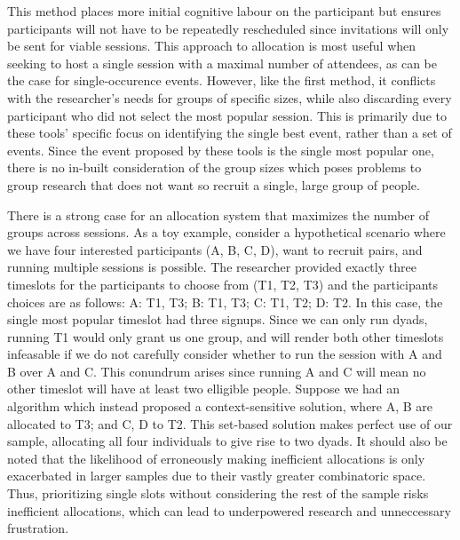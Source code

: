 \documentclass{article}
\begin{document}
  This method places more initial cognitive labour on the participant but ensures 
  participants will not have to be repeatedly rescheduled since invitations will only be sent for viable sessions.
  This approach to allocation is most useful when seeking to host a single session
  with a maximal number of attendees, as can be the case for single-occurence events. However, like the first method, it conflicts with the 
  researcher's needs for groups of specific sizes, 
  while also discarding every participant who did not select the most popular session. 
  This is primarily due to these tools' specific focus on identifying the single best event, rather than a set of events.
  Since the event proposed by these tools is the single most popular one, there is no in-built consideration of the group sizes
  which poses problems to group research that does not want so recruit a single, large group of people.
  \par
  There is a strong case for an allocation system that maximizes the number of groups across sessions. 
  As a toy example, consider a hypothetical scenario where we have four interested participants (A, B, C, D), want to recruit pairs, and running multiple sessions is possible.
  The researcher provided exactly three timeslots for the participants to choose from (T1, T2, T3) and the participants choices are as follows:
  A: T1, T3; B: T1, T3; C: T1, T2; D: T2. 
  In this case, the single most popular timeslot had three signups. Since we can only run dyads, running T1 would only grant us one group, 
  and will render both other timeslots infeasable if we do not carefully consider whether to run the session with A and B over A and C.
  This conundrum arises since running A and C will mean no other timeslot will have at least two elligible people.  
  Suppose we had an algorithm which instead proposed a context-sensitive solution, where A, B are allocated to T3; and C, D to T2.  
  This set-based solution makes perfect use of our sample, allocating all four individuals to give rise to two dyads.
  It should also be noted that the likelihood of erroneously making inefficient allocations is only exacerbated in larger samples due to their vastly greater combinatoric space.
  Thus, prioritizing single slots without considering the rest of the sample risks inefficient allocations, which can lead to underpowered research and unneccessary frustration. 
  
\end{document}
